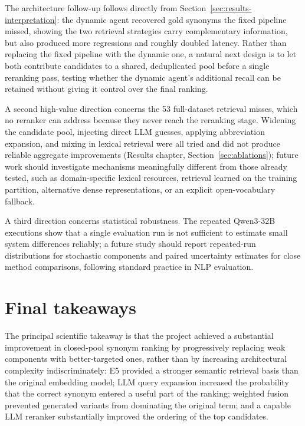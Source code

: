 The architecture follow-up follows directly from Section~\ref{sec:results-interpretation}: the dynamic agent recovered gold synonyms the fixed pipeline missed, showing the two retrieval strategies carry complementary information, but also produced more regressions and roughly doubled latency. Rather than replacing the fixed pipeline with the dynamic one, a natural next design is to let both contribute candidates to a shared, deduplicated pool before a single reranking pass, testing whether the dynamic agent's additional recall can be retained without giving it control over the final ranking.

A second high-value direction concerns the 53 full-dataset retrieval misses, which no reranker can address because they never reach the reranking stage. Widening the candidate pool, injecting direct LLM guesses, applying abbreviation expansion, and mixing in lexical retrieval were all tried and did not produce reliable aggregate improvements (Results chapter, Section~\ref{sec:ablations}); future work should investigate mechanisms meaningfully different from those already tested, such as domain-specific lexical resources, retrieval learned on the training partition, alternative dense representations, or an explicit open-vocabulary fallback.

A third direction concerns statistical robustness. The repeated Qwen3-32B executions show that a single evaluation run is not sufficient to estimate small system differences reliably; a future study should report repeated-run distributions for stochastic components and paired uncertainty estimates for close method comparisons, following standard practice in NLP evaluation.

\section{Final takeaways}

The principal scientific takeaway is that the project achieved a substantial improvement in closed-pool synonym ranking by progressively replacing weak components with better-targeted ones, rather than by increasing architectural complexity indiscriminately: E5 provided a stronger semantic retrieval basis than the original embedding model; LLM query expansion increased the probability that the correct synonym entered a useful part of the ranking; weighted fusion prevented generated variants from dominating the original term; and a capable LLM reranker substantially improved the ordering of the top candidates.

